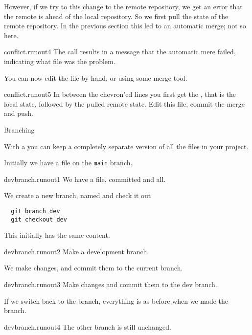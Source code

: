 However, if we try to  this change to the remote repository,
we get an error that the remote is ahead of the local repository.
So we first pull the state of the remote repository.
In the previous section this led to an automatic merge;
not so here.

\begin{gitstep}{conflict.runout4}
  The  call results in a message that the automatic mere failed,
  indicating what file was the problem.
\end{gitstep}

You can now edit the file by hand, or using some merge tool.

\begin{gitstep}{conflict.runout5}
  In between the chevron'ed lines you first get the ,
  that is the local state, followed by the pulled remote state.
  Edit this file, commit the merge and push.
\end{gitstep}

 {Branching}

With a  you can keep a completely
separate version of all the files in your project.

Initially we have a file on the \lstinline{main} branch.

\begin{gitstep}{devbranch.runout1}
  We have a file, committed and all.
\end{gitstep}

We create a new branch, named 
and check it out
\begin{lstlisting}
  git branch dev
  git checkout dev
\end{lstlisting}
This initially has the same content.

\begin{gitstep}{devbranch.runout2}
  Make a development branch.
\end{gitstep}

We make changes, and commit them to the current branch.

\begin{gitstep}{devbranch.runout3}
  Make changes and commit them to the dev branch.
\end{gitstep}

If we switch back to the  branch,
everything is as before when we made the  branch.

\begin{gitstep}{devbranch.runout4}
  The other branch is still unchanged.
\end{gitstep}

